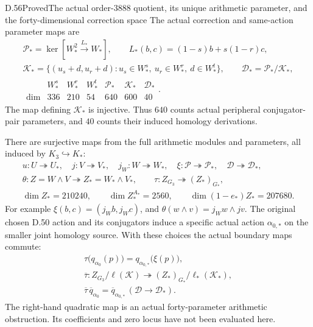 \begin{statement}{D.56}{Proved}{The actual order-\(3888\) quotient, its unique arithmetic parameter, and the forty-dimensional correction space}
The actual correction and same-action parameter maps are
\[
 \begin{gathered}
 \mathcal P_*=\ker\!\left[
 W_*^2\xrightarrow{\,L_*\,}W_*\right],
 \qquad L_*(b,c)=(1-s)b+s(1-r)c,\\
 \mathcal K_*=
 \{(u_s+d,u_r+d):
       u_s\in W_*^s,\ u_r\in W_*^r,\ d\in W_*^t\},
 \qquad \mathscr D_*=\mathcal P_*/\mathcal K_*,\\
 \begin{array}{c|rrrrrr}
 &W_*^s&W_*^r&W_*^t&
       \mathcal P_*&\mathcal K_*&\mathscr D_*\\ \hline
 \dim&336&210&54&640&600&40
 \end{array}.
 \end{gathered}
 \tag{D.56.8}
\]
The map defining \(\mathcal K_*\) is injective.
Thus \(640\) counts actual peripheral conjugator-pair parameters,
and \(40\) counts their induced homology derivations.

There are surjective maps from the full arithmetic modules and
parameters, all induced by \(K_3\hookrightarrow K_*\):
\[
 \begin{gathered}
 u:U\twoheadrightarrow U_*,
 \quad j:V\twoheadrightarrow V_*,
 \quad j_W:W\twoheadrightarrow W_*,
 \quad \xi:\mathcal P\twoheadrightarrow\mathcal P_*,
 \quad \mathscr D\twoheadrightarrow\mathscr D_*,\\
 \theta:Z=W\wedge V\twoheadrightarrow
       Z_*=W_*\wedge V_*,
 \qquad \tau:Z_{G_3}\twoheadrightarrow (Z_*)_{G_*},\\
 \dim Z_*=210240,\qquad
 \dim Z_*^{A_*}=2560,\qquad
 \dim(1-e_*)Z_*=207680 .
 \end{gathered}
 \tag{D.56.9}
\]
For example \(\xi(b,c)=(j_Wb,j_Wc)\), and
\(\theta(w\wedge v)=j_Ww\wedge jv\).
The original chosen D.50 action and its conjugators induce
a specific actual action \(\alpha_{0,*}\) on the smaller
joint homology source. With these choices the actual boundary maps
commute:
\[
 \begin{gathered}
 \tau\bigl(q_{\alpha_0}(p)\bigr)
       =q_{\alpha_{0,*}}\bigl(\xi(p)\bigr),\\
 \overline\tau:
 Z_{G_3}/\ell(\mathcal K)
       \twoheadrightarrow
 (Z_*)_{G_*}/\ell_*(\mathcal K_*),\\
 \overline\tau\,\overline q_{\alpha_0}
       =\overline q_{\alpha_{0,*}}\,
          (\mathscr D\longrightarrow\mathscr D_*).
 \end{gathered}
 \tag{D.56.10}
\]
The right-hand quadratic map is an actual forty-parameter
arithmetic obstruction. Its coefficients and zero locus have
not been evaluated here.


\end{statement}
